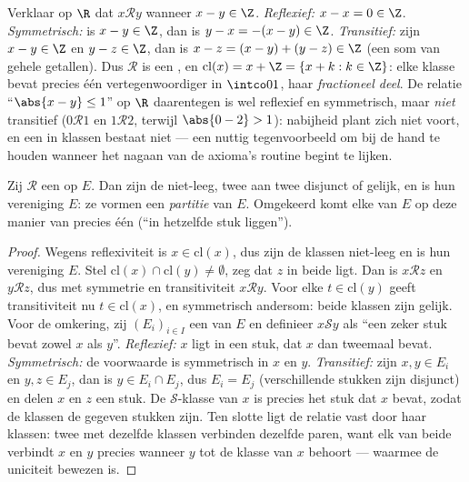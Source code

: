 \begin{example}\label{ex:b1:logic:fracpart}
Verklaar op $\R$ dat $x \mathbin{\mathcal{R}} y$ wanneer $x - y \in \Z$.
\emph{Reflexief:} $x - x = 0 \in \Z$. \emph{Symmetrisch:} is $x - y \in
\Z$, dan is $y - x = -(x - y) \in \Z$. \emph{Transitief:} zijn $x - y \in
\Z$ en $y - z \in \Z$, dan is $x - z = (x - y) + (y - z) \in \Z$ (een som
van gehele getallen). Dus $\mathcal R$ is een , en
$\mathrm{cl}(x) = x + \Z = \{x + k : k \in \Z\}$: elke klasse bevat
precies één vertegenwoordiger in $\intco01$, haar \emph{fractioneel
deel}. De relatie ``$\abs{x - y} \leq 1$'' op $\R$ daarentegen is wel
reflexief en symmetrisch, maar \emph{niet} transitief ($0
\mathbin{\mathcal R} 1$ en $1 \mathbin{\mathcal R} 2$, terwijl $\abs{0 -
2} > 1$): nabijheid plant zich niet voort, en een  in klassen
bestaat niet --- een nuttig tegenvoorbeeld om bij de hand te houden
wanneer het nagaan van de axioma's routine begint te lijken.
\end{example}

\begin{theorem}\label{thm:b1:logic:partition}
Zij $\mathcal{R}$ een  op $E$. Dan zijn de
 niet-leeg, twee aan twee disjunct of gelijk, en is
hun vereniging $E$: ze vormen een \emph{partitie} van
$E$. Omgekeerd komt elke  van $E$ op deze manier van precies één
 (``in hetzelfde stuk liggen'').
\end{theorem}

\begin{proof}
Wegens reflexiviteit is $x \in \mathrm{cl}(x)$, dus zijn de klassen
niet-leeg en is hun vereniging $E$. Stel $\mathrm{cl}(x) \cap
\mathrm{cl}(y) \neq \emptyset$, zeg dat $z$ in beide ligt. Dan is $x
\mathbin{\mathcal{R}} z$ en $y \mathbin{\mathcal{R}} z$, dus met symmetrie
en transitiviteit $x \mathbin{\mathcal{R}} y$. Voor elke $t \in
\mathrm{cl}(y)$ geeft transitiviteit nu $t \in \mathrm{cl}(x)$, en
symmetrisch andersom: beide klassen zijn gelijk. Voor de omkering, zij
$(E_i)_{i \in I}$ een  van $E$ en definieer $x \mathbin{\mathcal
S} y$ als ``een zeker stuk bevat zowel $x$ als $y$''. \emph{Reflexief:}
$x$ ligt in een stuk, dat $x$ dan tweemaal bevat. \emph{Symmetrisch:} de
voorwaarde is symmetrisch in $x$ en $y$. \emph{Transitief:} zijn $x, y
\in E_i$ en $y, z \in E_j$, dan is $y \in E_i \cap E_j$, dus $E_i = E_j$
(verschillende stukken zijn disjunct) en delen $x$ en $z$ een stuk. De
$\mathcal S$-klasse van $x$ is precies het stuk dat $x$ bevat, zodat de
klassen de gegeven stukken zijn. Ten slotte ligt de relatie vast door
haar klassen: twee  met dezelfde klassen verbinden
dezelfde paren, want elk van beide verbindt $x$ en $y$ precies wanneer
$y$ tot de klasse van $x$ behoort --- waarmee de uniciteit bewezen is.
\end{proof}

